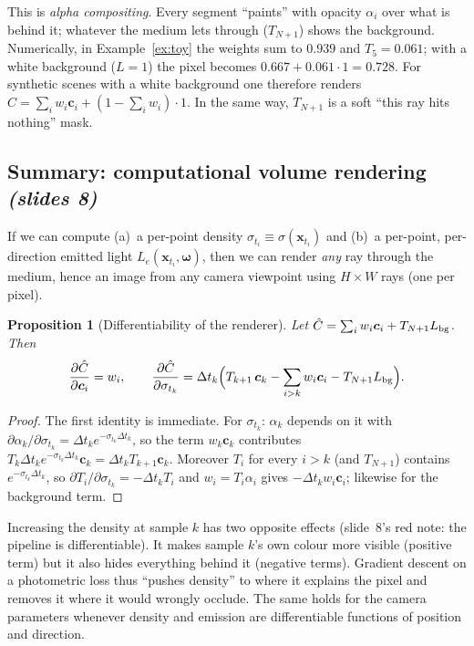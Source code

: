 \documentclass[11pt,a4paper]{article}
\newcommand{\sref}[1]{\texorpdfstring{\emph{(slides #1)}}{(slides #1)}}
\newcommand{\om}{\boldsymbol{\omega}}
\newcommand{\cc}{\boldsymbol{c}}
\newcommand{\xx}{\boldsymbol{x}}
\newcommand{\Le}{L_e}
\theoremstyle{definition}
\theoremstyle{plain}
\newtheorem{proposition}[definition]{Proposition}
\theoremstyle{remark}
\begin{document}
\begin{intuition}
This is \emph{alpha compositing}. Every segment ``paints'' with opacity $\alpha_i$ over what is behind it; whatever the medium lets through ($T_{N+1}$) shows the background. Numerically, in Example~\ref{ex:toy} the weights sum to $0.939$ and $T_5=0.061$; with a white background ($L=1$) the pixel becomes $0.667+0.061\cdot 1=0.728$. For synthetic scenes with a white background one therefore renders $\hat C=\sum_iw_i\cc_i+(1-\sum_iw_i)\cdot 1$. In the same way, $T_{N+1}$ is a soft ``this ray hits nothing'' mask.
\end{intuition}

\subsection{Summary: computational volume rendering \sref{8}}

If we can compute (a)~a per-point density $\sigma_{t_i}\equiv\sigma(\xx_{t_i})$ and (b)~a per-point, per-direction emitted light $\Le(\xx_{t_i},\om)$, then we can render \emph{any} ray through the medium, hence an image from any camera viewpoint using $H\times W$ rays (one per pixel).

\begin{proposition}[Differentiability of the renderer]\label{prop:grad}
Let $\hat C=\sum_iw_i\cc_i+T_{N+1}L_{\rm bg}$. Then
\[
\frac{\partial\hat C}{\partial\cc_i}=w_i,\qquad
\frac{\partial\hat C}{\partial\sigma_{t_k}}=\Delta t_k\Big(T_{k+1}\,\cc_k-\sum_{i>k}w_i\cc_i-T_{N+1}L_{\rm bg}\Big).
\]
\end{proposition}
\begin{proof}
The first identity is immediate. For $\sigma_{t_k}$: $\alpha_k$ depends on it with $\partial\alpha_k/\partial\sigma_{t_k}=\Delta t_ke^{-\sigma_{t_k}\Delta t_k}$, so the term $w_k\cc_k$ contributes $T_k\Delta t_ke^{-\sigma_{t_k}\Delta t_k}\cc_k=\Delta t_kT_{k+1}\cc_k$. Moreover $T_i$ for every $i>k$ (and $T_{N+1}$) contains $e^{-\sigma_{t_k}\Delta t_k}$, so $\partial T_i/\partial\sigma_{t_k}=-\Delta t_kT_i$ and $w_i=T_i\alpha_i$ gives $-\Delta t_kw_i\cc_i$; likewise for the background term.
\end{proof}

\begin{intuition}
Increasing the density at sample $k$ has two opposite effects (slide~8's red note: the pipeline is differentiable). It makes sample $k$'s own colour more visible (positive term) but it also hides everything behind it (negative terms). Gradient descent on a photometric loss thus ``pushes density'' to where it explains the pixel and removes it where it would wrongly occlude. The same holds for the camera parameters whenever density and emission are differentiable functions of position and direction.
\end{intuition}
\end{document}
